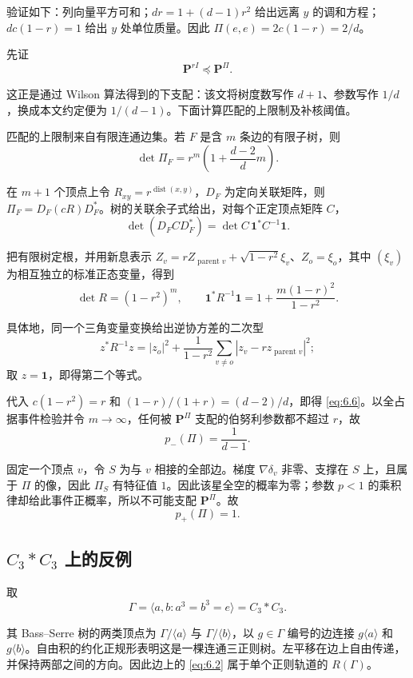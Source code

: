 \documentclass[UTF8,zihao=-4,a4paper]{ctexart}
\numberwithin{equation}{section}
\begin{document}
验证如下：列向量平方可和；\(dr=1+(d-1)r^2\) 给出远离 \(y\) 的调和方程；\(dc(1-r)=1\) 给出 \(y\) 处单位质量。因此
\(\Pi(e,e)=2c(1-r)=2/d\)。

先证
\[
\mathbf P^{rI}\preceq\mathbf P^\Pi.
\tag{6.4}\label{eq:6.4}
\]

这正是\cite[\S11, proof of Theorem~11.1]{BLPS}通过 Wilson 算法得到的下支配：该文将树度数写作 $d+1$、参数写作 $1/d$，换成本文约定便为 $1/(d-1)$。下面计算匹配的上限制及补核阈值。

匹配的上限制来自有限连通边集。若 \(F\) 是含 \(m\) 条边的有限子树，则
\[
\det\Pi_F
=r^m\left(1+\frac{d-2}{d}m\right).
\tag{6.5}\label{eq:6.6}
\]

在 \(m+1\) 个顶点上令
\(R_{xy}=r^{\operatorname{dist}(x,y)}\)，\(D_F\) 为定向关联矩阵，则
\(\Pi_F=D_F(cR)D_F^*\)。树的关联余子式给出，对每个正定顶点矩阵 \(C\)，
\[
\det(D_FCD_F^*)=\det C\,\mathbf1^*C^{-1}\mathbf1.
\]

把有限树定根，并用新息表示
\(Z_v=rZ_{\operatorname{parent}v}+\sqrt{1-r^2}\xi_v\)、\(Z_o=\xi_o\)，其中 \((\xi_v)\) 为相互独立的标准正态变量，得到
\[
\det R=(1-r^2)^m,\qquad
\mathbf1^*R^{-1}\mathbf1=1+\frac{m(1-r)^2}{1-r^2}.
\]

具体地，同一个三角变量变换给出逆协方差的二次型
\[
 z^*R^{-1}z=|z_o|^2+
 \frac{1}{1-r^2}\sum_{v\ne o}|z_v-rz_{\operatorname{parent}v}|^2;
\]
取 \(z=\mathbf1\)，即得第二个等式。

代入 \(c(1-r^2)=r\) 和 \((1-r)/(1+r)=(d-2)/d\)，即得 \eqref{eq:6.6}。以全占据事件检验并令 \(m\to\infty\)，任何被 \(\mathbf P^\Pi\) 支配的伯努利参数都不超过 \(r\)，故
\[
p_-(\Pi)=\frac1{d-1}.
\tag{6.6}\label{eq:6.7}
\]


固定一个顶点 \(v\)，令 \(S\) 为与 \(v\) 相接的全部边。梯度 \(\nabla\delta_v\) 非零、支撑在 \(S\) 上，且属于 \(\Pi\) 的像，因此 \(\Pi_S\) 有特征值 \(1\)。因此该星全空的概率为零；参数 \(p<1\) 的乘积律却给此事件正概率，所以不可能支配 \(\mathbf P^\Pi\)。故
\[
p_+(\Pi)=1.
\tag{6.7}\label{eq:6.8}
\]


\subsection{\(C_3*C_3\) 上的反例}

取
\[
\Gamma=\langle a,b:a^3=b^3=e\rangle=C_3*C_3.
\]

其 Bass--Serre 树的两类顶点为
\(\Gamma/\langle a\rangle\) 与 \(\Gamma/\langle b\rangle\)，以 \(g\in\Gamma\) 编号的边连接
\(g\langle a\rangle\) 和 \(g\langle b\rangle\)。自由积的约化正规形表明这是一棵连通三正则树。左平移在边上自由传递，并保持两部之间的方向。因此边上的 \eqref{eq:6.2} 属于单个正则轨道的 \(R(\Gamma)\)。
\end{document}
